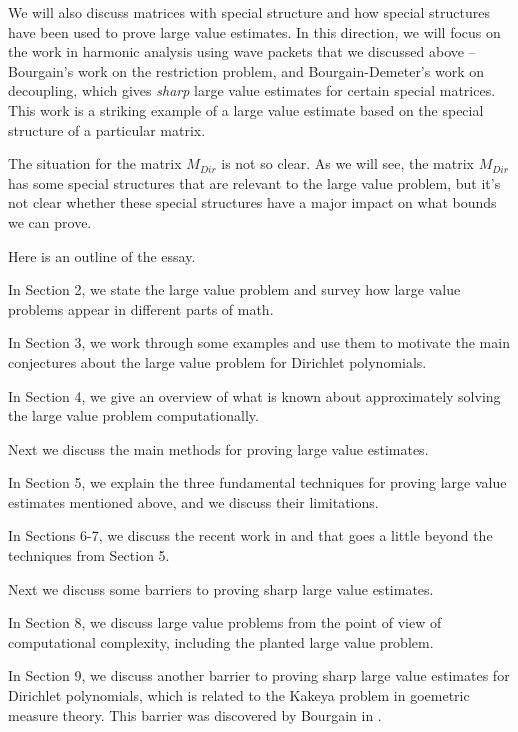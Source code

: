 \documentclass{amsart}
\begin{document}
We will also discuss matrices with special structure and how special structures have been used to prove large value estimates.   In this direction,  we will focus on the work in harmonic analysis using wave packets that we discussed above -- Bourgain's work \cite{B3} on the restriction problem,  and Bourgain-Demeter's work \cite{BD} on decoupling,  which gives {\it sharp} large value estimates for certain special matrices.    This work is 
a striking example of a large value estimate based on the special structure of a particular matrix.

The situation for the matrix $M_{Dir}$ is not so clear.   As we will see,  the matrix $M_{Dir}$ has some special structures that are relevant to the large value problem,  but it's not clear whether these special structures have a major impact on what bounds we can prove.

\vskip10pt

Here is an outline of the essay.

\vskip10pt

In Section 2, we state the large value problem and survey how large value problems appear in different parts of math.

In Section 3,  we work through some examples and use them to motivate the main conjectures about the large value problem for Dirichlet polynomials.

In Section 4,  we give an overview of what is known about approximately solving the large value problem computationally.

Next we discuss the main methods for proving large value estimates.  

In Section 5, we explain the three fundamental techniques for proving large value estimates mentioned above, and we discuss their limitations.

In Sections 6-7, we discuss the recent work in \cite{GM} and \cite{DHPT} that goes a little beyond the techniques from Section 5.  

Next we discuss some barriers to proving sharp large value estimates. 

In Section 8, we discuss large value problems from the point of view of computational complexity,  including the planted large value problem.  

In Section 9,  we discuss another barrier to proving sharp large value estimates for Dirichlet polynomials,  which is related to the Kakeya problem in goemetric measure theory.   This barrier was discovered by Bourgain in \cite{Bour}.
\end{document}

